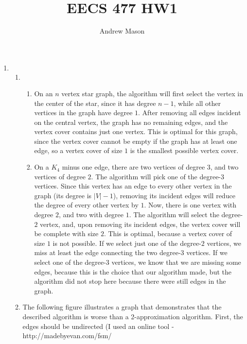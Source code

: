 \documentclass[12pt]{article}
\title{EECS 477 HW1}
\author{Andrew Mason}
\begin{document}
\maketitle
\begin{enumerate}
  \item
    \begin{enumerate}
      \item
        \begin{enumerate}
          \item
            On an $n$ vertex star graph, the algorithm will first select the
            vertex in the center of the star, since it has degree $n-1$, while
            all other vertices in the graph have degree $1$. After removing all
            edges incident on the central vertex, the graph has no remaining
            edges, and the vertex cover contains just one vertex. This is
            optimal for this graph, since the vertex cover cannot be empty if
            the graph has at least one edge, so a vertex cover of size $1$ is
            the smallest possible vertex cover.
          \item
            On a $K_4$ minus one edge, there are two vertices of degree $3$,
            and two vertices of degree $2$. The algorithm will pick one of the
            degree-$3$ vertices. Since this vertex has an edge to every other
            vertex in the graph (its degree is $|V| - 1$), removing its
            incident edges will reduce the degree of every other vertex by $1$.
            Now, there is one vertex with degree $2$, and two with degree $1$.
            The algorithm will select the degree-$2$ vertex, and, upon removing
            its incident edges, the vertex cover will be complete with size
            $2$. This is optimal, because a vertex cover of size $1$ is not
            possible. If we select just one of the degree-$2$ vertices, we miss
            at least the edge connecting the two degree-$3$ vertices. If we
            select one of the degree-$3$ vertices, we know that we are missing
            some edges, because this is the choice that our algorithm made, but
            the algorithm did not stop here because there were still edges in
            the graph.
        \end{enumerate}
      \item
        The following figure illustrates a graph that demonstrates that the
        described algorithm is worse than a 2-approximation algorithm. First,
        the edges should be undirected (I used an online tool - http://madebyevan.com/fsm/

\end{enumerate}
\end{enumerate}
\end{document}
